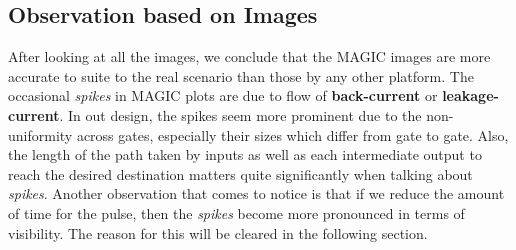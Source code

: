 \documentclass[a4paper, titlepage]{article}
\begin{document}
\subsection{Observation based on Images}
After looking at all the images, we conclude that the MAGIC images are more accurate to suite to the real scenario than
those by any other platform. The occasional \textit{spikes} in MAGIC plots are due to flow of \textbf{back-current} or 
\textbf{leakage-current}. In out design, the spikes seem more prominent due to the non-uniformity across gates, especially
their sizes which differ from gate to gate. Also, the length of the path taken by inputs as well as each intermediate output
to reach the desired destination matters quite significantly when talking about \textit{spikes}.\newline 
Another observation that comes to notice is that if we reduce the amount of time for the pulse, then the \textit{spikes}
become more pronounced in terms of visibility. The reason for this will be cleared in the following section. 
\end{document}
